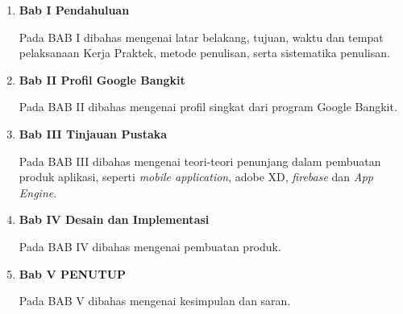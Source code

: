 \begin{enumerate}[nolistsep]

      \item \textbf{Bab I Pendahuluan}
            \vspace{0.5ex}

            Pada BAB I dibahas mengenai latar belakang, tujuan, waktu dan tempat
            pelaksanaan Kerja Praktek, metode penulisan, serta sistematika penulisan.
            \vspace{0.5ex}

      \item \textbf{Bab II Profil Google Bangkit}
            \vspace{0.5ex}

            Pada BAB II dibahas mengenai profil singkat dari program Google Bangkit.
            \vspace{0.5ex}

      \item \textbf{Bab III Tinjauan Pustaka}
            \vspace{0.5ex}

            Pada BAB III dibahas mengenai teori-teori penunjang dalam pembuatan produk aplikasi,
            seperti \textit{mobile application}, adobe XD, \textit{firebase} dan \textit{App Engine}.
            \vspace{0.5ex}

      \item \textbf{Bab IV Desain dan Implementasi}
            \vspace{0.5ex}

            Pada BAB IV dibahas mengenai pembuatan produk.

            \vspace{0.5ex}

      \item \textbf{Bab V PENUTUP}
            \vspace{0.5ex}

            Pada BAB V dibahas mengenai kesimpulan dan saran.
            \vspace{0.5ex}

\end{enumerate}